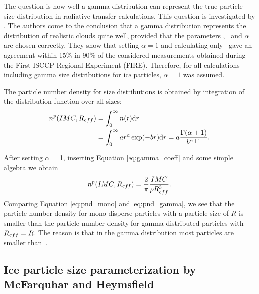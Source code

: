 The question is how well a gamma distribution can represent the true
particle size distribution in radiative transfer calculations. This
question is investigated by \citet{evans:98}. The authors come to the
conclusion that a gamma distribution represents the distribution of
realistic clouds quite well, provided that the parameters \Reff, \imc\ 
and $\alpha$ are chosen correctly. They show that setting $\alpha = 1$
and calculating only \Reff\ gave an agreement within 15\% in 90\% of
the considered measurements obtained during the First ISCCP Regional
Experiment (FIRE).  Therefore, for all calculations including gamma
size distributions for ice particles, $\alpha = 1$ was assumed.  

The particle number density for size distributions is obtained by
integration of the distribution function over all sizes:
\begin{eqnarray}
  n^p(IMC, R_{eff}) &= \int_0^\infty {n(r)\ensuremath{\mathrm{d}}r} \\
 &= \int_0^\infty {a  r^\alpha \exp(-br)
    \ensuremath{\mathrm{d}}r} = a \frac{\Gamma(\alpha+1)}{b^{\alpha+1}}.
\end{eqnarray}

After setting $\alpha$ = 1, inserting Equation \ref{eq:gamma_coeff} and
some simple algebra we obtain
\begin{equation}
  \label{eq:pnd_gamma}
  n^p(IMC, R_{eff}) = \frac{2}{\pi} \frac{IMC}{\rho R_{eff}^3}.
\end{equation}
Comparing Equation \ref{eq:pnd_mono} and \ref{eq:pnd_gamma}, we see
that the particle number density for mono-disperse particles with a
particle size of $R$ is smaller than the particle number density for
gamma distributed particles with $R_{eff}=R$. The reason is that in the
gamma distribution most particles are smaller than~\Reff.

\subsection[McFarquhar and Heymsfield parametrization]
{Ice particle size parameterization by McFarquhar and Heymsfield}
\label{sec:McFHey_distr}

